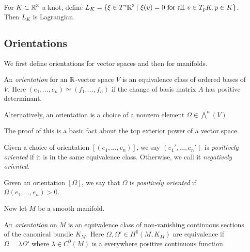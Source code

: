 \documentclass[twoside, 10pt]{article}
\begin{document}
    \begin{exm}
        For $K \subset \mathbb{R}^3$ a knot, define $L_K = \{ \xi \in T^*\mathbb{R}^3 \mid \xi(v) = 0 \text{ for all } v \in T_pK, p \in K\}$. Then $L_K$ is Lagrangian.
    \end{exm}

    \subsection{Orientations}%
    \label{sub:orientations}
    
    We first define orientations for vector spaces and then for manifolds.

    \begin{defn}
        An \textit{orientation} for an $\mathbb{R}$-vector space $V$ is an equivalence class of ordered bases of $V$. Here $(e_1, \ldots, e_n) \simeq (f_1, \ldots, f_n)$ if the change of basis matrix $A$ has positive determinant.
    \end{defn}

    \begin{lem}
        Alternatively, an orientation is a choice of a nonzero element $\Omega \in \bigwedge^n(V)$.
    \end{lem}

    The proof of this is a basic fact about the top exterior power of a vector space.

    \begin{defn}
        Given a choice of orientation $[(e_1, \ldots, e_n)]$, we say $(e_1', \ldots, e_n')$ is \textit{positively oriented} if it is in the same equivalence class. Otherwise, we call it \textit{negatively oriented}.
    \end{defn}

    \begin{defn}
        Given an orientation $[\Omega]$, we say that $\Omega$ is \textit{positively oriented} if $\Omega(e_1, \ldots, e_n) > 0$.
    \end{defn}

    Now let $M$ be a smooth manifold.

    \begin{defn}
        An \textit{orientation} on $M$ is an equivalence class of non-vanishing continuous sections of the canonical bundle $K_M$. Here $\Omega, \Omega' \in H^0(M, K_M)$ are equivalence if $\Omega = \lambda \Omega'$ where $\lambda \in C^0(M)$ is a everywhere positive continuous function.
    \end{defn}
\end{document}
